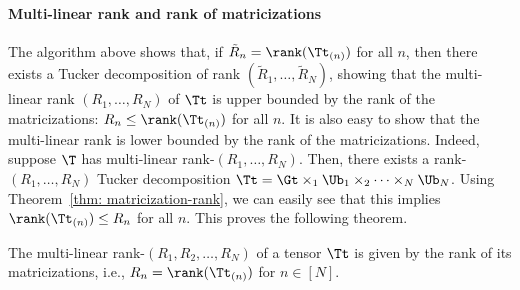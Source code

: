 \paragraph{Multi-linear rank and rank of matricizations}
The algorithm above shows that, if $\tilde R_n = \rank(\Tt_{(n)})$ for all $n$, then there exists a Tucker decomposition of rank $(\tilde R_1,\dots, \tilde R_N)$, showing that the multi-linear rank $( R_1,\dots, R_N)$ of $\Tt$ is upper bounded by the rank of the matricizations: $ R_n \leq \rank(\Tt_{(n)} )$ for all $n$. It is also easy to show that the multi-linear rank is lower bounded by the rank of the matricizations. Indeed, suppose $\T$ has multi-linear rank-$(R_1,\dots, R_N)$. Then, there exists a rank-$(R_1,\dots, R_N)$ Tucker decomposition $\Tt = \Gt\times_1\Ub_1\times_2 \dots \times_N \Ub_N$. Using Theorem~\ref{thm: matricization-rank}, we can easily see that this implies $\rank(\Tt_{(n)} )\leq  R_n$ for all $n$.
This proves the following theorem.
\begin{theorem}
The multi-linear rank-$(R_1,R_2,\dots, R_N)$ of a tensor $\Tt$ is given by the rank of its matricizations, i.e., $R_n = \rank(\Tt_{(n)})$ for $n\in[N]$.
\end{theorem}


